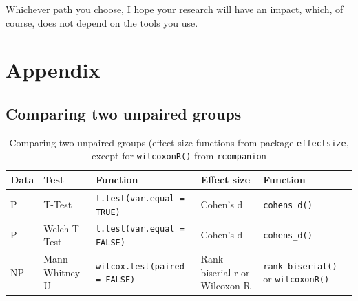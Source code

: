 \documentclass[
  letterpaper,
  DIV=11,
  numbers=noendperiod]{scrreprt}
\begin{document}
Whichever path you choose, I hope your research will have an impact,
which, of course, does not depend on the tools you use.


\chapter*{Appendix}\label{sec-appendix}


\section*{Comparing two unpaired
groups}\label{sec-comparing-two-unpaired-groups}


\begingroup
\fontsize{9.0pt}{10.8pt}\selectfont
\setlength{\LTpost}{0mm}

\begin{longtable}{>{\raggedright\arraybackslash}p{\dimexpr 30.00pt -2\tabcolsep-1.5\arrayrulewidth}>{\raggedright\arraybackslash}p{\dimexpr 60.00pt -2\tabcolsep-1.5\arrayrulewidth}>{\raggedright\arraybackslash}p{\dimexpr 97.50pt -2\tabcolsep-1.5\arrayrulewidth}>{\raggedright\arraybackslash}p{\dimexpr 75.00pt -2\tabcolsep-1.5\arrayrulewidth}>{\raggedright\arraybackslash}p{\dimexpr 75.00pt -2\tabcolsep-1.5\arrayrulewidth}}

\caption{\label{tbl-comparing-two-groups-unpaired-baser}Comparing two
unpaired groups (effect size functions from package \texttt{effectsize},
except for \texttt{wilcoxonR()} from \texttt{rcompanion}}

\tabularnewline

\toprule
Data & Test & Function & Effect size & Function \\ 
\midrule\addlinespace[2.5pt]
P & T-Test & \texttt{t.test(var.equal = TRUE)} & Cohen's d & \texttt{cohens\_d()} \\ 
P & Welch T-Test & \texttt{t.test(var.equal = FALSE)} & Cohen's d & \texttt{cohens\_d()} \\ 
NP & Mann--Whitney U & \texttt{wilcox.test(paired = FALSE)} & Rank-biserial r
or
Wilcoxon R & \texttt{rank\_biserial()}
or
\texttt{wilcoxonR()} \\ 
\bottomrule

\end{longtable}
\end{document}
